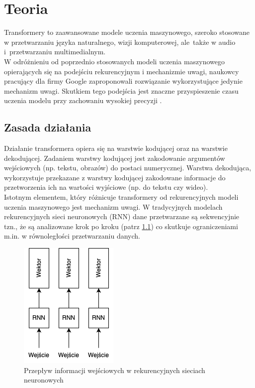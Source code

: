 \documentclass[12pt,a4paper,oneside]{book}
\begin{document}
\chapter{Teoria}

Transformery to zaawansowane modele uczenia maszynowego, szeroko stosowane w przetwarzaniu języka naturalnego, wizji komputerowej, ale~także w audio i~przetwarzaniu multimedialnym. \\ 
W odróżnieniu od poprzednio stosowanych modeli uczenia maszynowego opierających się na podejściu rekurencyjnym i mechanizmie uwagi, naukowcy pracujący dla firmy Google zaproponowali rozwiązanie wykorzystujące jedynie mechanizm uwagi. Skutkiem tego podejścia jest znaczne przyspieszenie czasu uczenia modelu przy zachowaniu wysokiej precyzji \cite{vaswani2023attentionneed}.
\section{Zasada działania}
Działanie transformera opiera się na warstwie kodującej oraz na warstwie dekodującej.
Zadaniem warstwy kodującej jest zakodowanie argumentów wejściowych (np. tekstu, obrazów) do postaci numerycznej. Warstwa dekodująca, wykorzystuje przekazane z warstwy kodującej zakodowane informacje do przetworzenia ich na wartości wyjściowe (np. do tekstu czy wideo). \\
Istotnym elementem, który różnicuje transformery od rekurencyjnych modeli uczenia maszynowego jest mechanizm uwagi. W tradycyjnych modelach rekurencyjnych sieci neuronowych (RNN) dane przetwarzane są sekwencyjnie tzn., że są analizowane krok po kroku (patrz \ref{fig:rnn_schema}) \cite{mamczur2020} co skutkuje ograniczeniami m.in. w równoległości przetwarzaniu danych.

\begin{figure}[h]
    \centering
	\includegraphics[scale=0.75]{figs/rnn.png}
	\caption{Przepływ informacji wejściowych w rekurencyjnych sieciach neuronowych}
	\label{fig:rnn_schema}
\end{figure}
\end{document}
